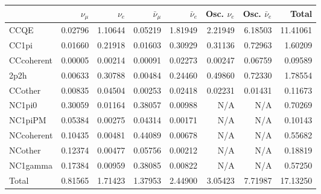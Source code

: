 \begin{tabular} { | l ||r | r | r | r | r | r | | r | }
\hline
              & $\nu_\mu$            & $\nu_e$              & $\bar{\nu}_{\mu}$    & $\bar{\nu}_{e}$      & Osc. $\nu_e$         & Osc. $\bar{\nu}_{e}$ & Total                \\ \hline\hline
 CCQE         & 0.02796              & 1.10644              & 0.05219              & 1.81949              & 2.21949              & 6.18503              & 11.41061             \\ \hline
 CC1pi        & 0.01660              & 0.21918              & 0.01603              & 0.30929              & 0.31136              & 0.72963              & 1.60209              \\ \hline
 CCcoherent   & 0.00005              & 0.00214              & 0.00091              & 0.02273              & 0.00247              & 0.06759              & 0.09589              \\ \hline
 2p2h         & 0.00633              & 0.30788              & 0.00484              & 0.24460              & 0.49860              & 0.72330              & 1.78554              \\ \hline
 CCother      & 0.00835              & 0.04504              & 0.00253              & 0.02418              & 0.02231              & 0.01431              & 0.11673              \\ \hline
 NC1pi0       & 0.30059              & 0.01164              & 0.38057              & 0.00988              & N/A                  & N/A                  & 0.70269              \\ \hline
 NC1piPM      & 0.05384              & 0.00275              & 0.04314              & 0.00171              & N/A                  & N/A                  & 0.10143              \\ \hline
 NCcoherent   & 0.10435              & 0.00481              & 0.44089              & 0.00678              & N/A                  & N/A                  & 0.55682              \\ \hline
 NCother      & 0.12374              & 0.00477              & 0.05756              & 0.00212              & N/A                  & N/A                  & 0.18819              \\ \hline
 NC1gamma     & 0.17384              & 0.00959              & 0.38085              & 0.00822              & N/A                  & N/A                  & 0.57250              \\ \hline
\hline
 Total        & 0.81565              & 1.71423              & 1.37953              & 2.44900              & 3.05423              & 7.71987              & 17.13250             \\ \hline

\end{tabular}
